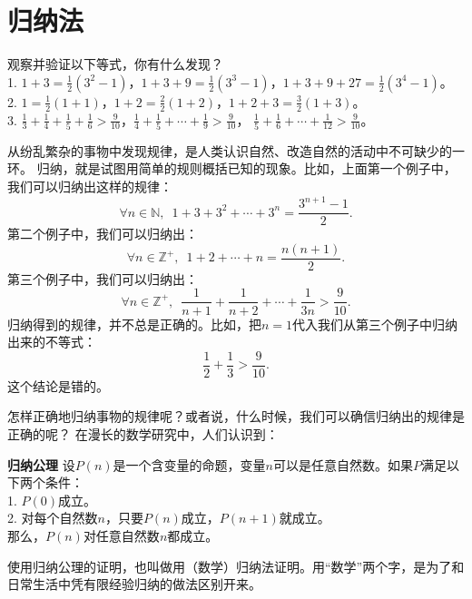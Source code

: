 \documentclass[12pt,UTF8,fontset=none]{ctexbook}
\begin{document}
\section{归纳法}
\begin{ex}\label{ex:2-2-0}
    观察并验证以下等式，你有什么发现？\\
    1. $1 + 3 = \frac12(3^2 - 1)$，$1 + 3 + 9 = \frac12(3^3 - 1)$，$1 + 3 + 9 + 27 = \frac12(3^4 - 1)$。\\
    2. $1 = \frac12(1+1)$，$1 + 2 = \frac22(1 + 2)$，$1 + 2 + 3 = \frac32(1 + 3)$。\\
    3. $\frac13 + \frac14 + \frac15 + \frac16 > \frac{9}{10}$，$\frac14 + \frac15 + \cdots + \frac{1}{9} > \frac{9}{10}$，
    $\frac15 + \frac16 + \cdots + \frac{1}{12} > \frac{9}{10}$。    
\end{ex}
从纷乱繁杂的事物中发现规律，是人类认识自然、改造自然的活动中不可缺少的一环。
归纳，就是试图用简单的规则概括已知的现象。比如，上面第一个例子中，我们可以归纳出这样的规律：
$$ \forall n \in \mathbb{N}, \,\,\, 1 + 3 + 3^2 + \cdots + 3^n = \frac{3^{n+1} - 1}{2}. $$
第二个例子中，我们可以归纳出：
$$ \forall n \in \mathbb{Z}^+, \,\,\, 1 + 2 + \cdots + n = \frac{n(n+1)}{2}. $$
第三个例子中，我们可以归纳出：
$$ \forall n \in \mathbb{Z}^+, \,\,\, \frac{1}{n+1} + \frac{1}{n+2} + \cdots + \frac{1}{3n} > \frac{9}{10}. $$
归纳得到的规律，并不总是正确的。比如，把$n=1$代入我们从第三个例子中归纳出来的不等式：
$$ \frac12 + \frac13 > \frac{9}{10}.$$
这个结论是错的。

怎样正确地归纳事物的规律呢？或者说，什么时候，我们可以确信归纳出的规律是正确的呢？
在漫长的数学研究中，人们认识到：
\begin{po}{\textbf{归纳公理}}
    设$P(n)$是一个含变量的命题，变量$n$可以是任意自然数。如果$P$满足以下两个条件：\\
    1. $P(0)$成立。\\
    2. 对每个自然数$n$，只要$P(n)$成立，$P(n+1)$就成立。\\
    那么，$P(n)$对任意自然数$n$都成立。
\end{po}
使用归纳公理的证明，也叫做用（数学）归纳法证明。用“数学”两个字，是为了和日常生活中凭有限经验归纳的做法区别开来。
\end{document}
